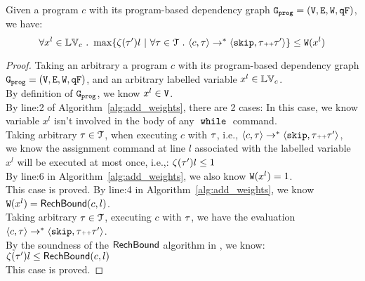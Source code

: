 
{
  \begin{thm}
    \label{thm:addweight_soundness}
  Given a program ${c}$ with its program-based dependency graph $\mathtt{{G_{prog}}} = (\mathtt{V}, \mathtt{E}, \mathtt{W}, \mathtt{qF})$, we have:
  \[
  \forall x^l \in \lvar_c \st 
  \max \left\{ \vcounter(\vtrace') l ~ \middle\vert~
  \forall \vtrace \in \mathcal{T} \st \config{{c}, \trace} \to^{*} \config{\eskip, \trace\tracecat\vtrace'} \right\} 
  \leq 
  \weights(x^l)
  \]
  \end{thm}
}
\begin{proof}
  Taking an arbitrary a program ${c}$ with its program-based dependency graph $\mathtt{{G_{prog}}} = (\mathtt{V}, \mathtt{E}, \mathtt{W}, \mathtt{qF})$, and an arbitrary labelled variable $x^l \in \mathbb{LV}_c$.
  \\
  By definition of $\mathtt{{G_{prog}}}$, we know $ x^l \in \mathtt{V}$. 
  \\
  By line:2 of Algorithm~\ref{alg:add_weights}, there are 2 cases:
  In this case, we know variable $x^l$ isn't involved in the body of any $\;\mathtt{while}\;$ command. 
  \\
  Taking arbitrary $\mathtt{\tau} \in \mathcal{T}$, when executing $c$ with $\mathtt{\tau}$, i.e., $\langle {c}, \mathtt{\tau} \rangle \to^{*} \langle \mathtt{skip}, \mathtt{\tau}{\scriptscriptstyle ++}\mathtt{\tau}' \rangle$,
  \\
  we know the
  assignment command at line $l$ associated with the labelled variable $x^l$ will be executed at most once, i.e.,:
  $\mathtt{\zeta}(\mathtt{\tau}') l \leq 1$
  \\
  By line:6 in Algorithm~\ref{alg:add_weights}, we also know $\mathtt{W}(x^l) = 1$.
  \\
  This case is proved.
  By line:4 in Algorithm~\ref{alg:add_weights}, we know  $\mathtt{W}(x^l) = \mathsf{RechBound}(c, l)$.
  \\
  Taking arbitrary $\mathtt{\tau} \in \mathcal{T}$, executing $c$ with $\mathtt{\tau}$, we have the evaluation $\langle {c}, \mathtt{\tau} \rangle \to^{*} \langle \mathtt{skip}, \mathtt{\tau}{\scriptscriptstyle ++}\mathtt{\tau}' \rangle$.
  \\
  By the soundness of the $\mathsf{RechBound}$ algorithm in \cite{Sumit2010rechability}, we know:
$\mathtt{\zeta}(\mathtt{\tau}') l \leq \mathsf{RechBound}(c, l)$
\\
This case is proved.
\end{proof}

